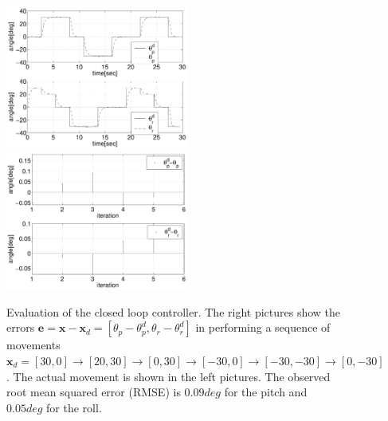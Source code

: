 \documentclass[conference]{IEEEtran}
\numberwithin{equation}{section}
\newcommand{\x}{\mathbf{x}}
\begin{document}
\begin{figure}[tbp]
\centering 
\includegraphics[width=60mm]{image/AngleJacobian.pdf} 
\includegraphics[width=60mm]{image/ErrorsJacobian.pdf} 
\caption{Evaluation of the closed loop controller. The right pictures show the errors $\mathbf e = \x - \x_d = [\theta_p - \theta_p^d, \theta_r - \theta_r^d]$ in performing a sequence of movements $\x_d = [30, 0] \rightarrow[20, 30] \rightarrow[0, 30] \rightarrow[-30, 0] \rightarrow[-30, -30] \rightarrow[0, -30]$. The actual movement is shown in the left pictures. The observed root mean squared error (RMSE) is $0.09deg$ for the pitch and $0.05deg$ for the roll.}
\label{Fig:ErrorJacobian}
\end{figure}
\end{document}
